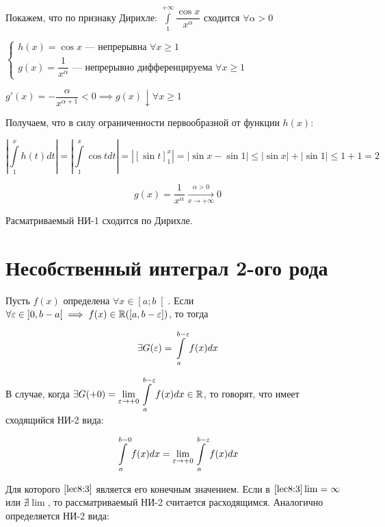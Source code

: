 \documentclass[../../main.tex]{subfiles}
\begin{document}
\begin{exmp}
 Покажем, что по признаку Дирихле: 
 $\displaystyle\int\limits_{1}^{+\infty}\dfrac{\cos{x}}{x^{\alpha}}$ сходится 
 $\forall \alpha > 0$
 
 $\begin{cases}
 h(x) = \cos{x} \text{~--- непрерывна } \forall x \geq 1\\
 g(x) = \dfrac{1}{x^{\alpha}} \text{~--- непрерывно дифференцируема } \forall 
 x \geq 1
 \end{cases}$
 
 $g'(x) = -\dfrac{\alpha}{x^{\alpha + 1}} < 0 \implies g(x) \downarrow \forall 
 x \geq 1$
 
 Получаем, что в силу ограниченности первообразной от функции $h(x)$:
 
 \[\left| \int\limits_{1}^{x}h(t)dt\right| = 
 \left|\int\limits_{1}^{x}\cos{t}dt\right| = \left| \left[ 
 \sin{t}\right]_{1}^{x} \right| = \left| \sin{x} - \sin{1} \right| \leq \left| 
 \sin{x} \right| + \left| \sin{1} \right| \leq 1 + 1 = 2\]
 
 \[g(x) = \dfrac{1}{x^{\alpha}} \xrightarrow[x \to +\infty]{\alpha > 0} 0\]
 
 Расматриваемый НИ-1 сходится по Дирихле.
 \end{exmp}
 
 \section{Несобственный интеграл 2-ого рода}
 
 Пусть $f(x)$ определена $\forall x \in \left[a; b \right[$. Если $\forall 
 \varepsilon \in \left] 0, b - a \right[ \implies f(x) \in \mathbb{R}(\left[a, b - 
 \varepsilon\right])$, то тогда

\begin{equation}\label{lec8:2}
\exists G(\varepsilon) = \displaystyle\int\limits_{a}^{b - \varepsilon}f(x)dx 
\end{equation}

В случае, когда $\exists G(+0) = \underset{\varepsilon \to +0}\lim 
\displaystyle\int\limits_{a}^{b - \varepsilon}f(x)dx \in \mathbb{R}$, то говорят, что имеет 
сходящийся НИ-2 вида:

\begin{equation}\label{lec8:3}
\displaystyle\int\limits_{a}^{b - 0}f(x)dx = \underset{\varepsilon \to +0}\lim 
\displaystyle\int\limits_{a}^{b - \varepsilon}f(x)dx
\end{equation}

Для которого $\eqref{lec8:3}$ является его конечным значением. Если в 
$\eqref{lec8:3} \lim = \infty$ или $\nexists \lim$, то рассматриваемый НИ-2 
считается расходящимся. Аналогично определяется НИ-2 вида:
\end{document}
